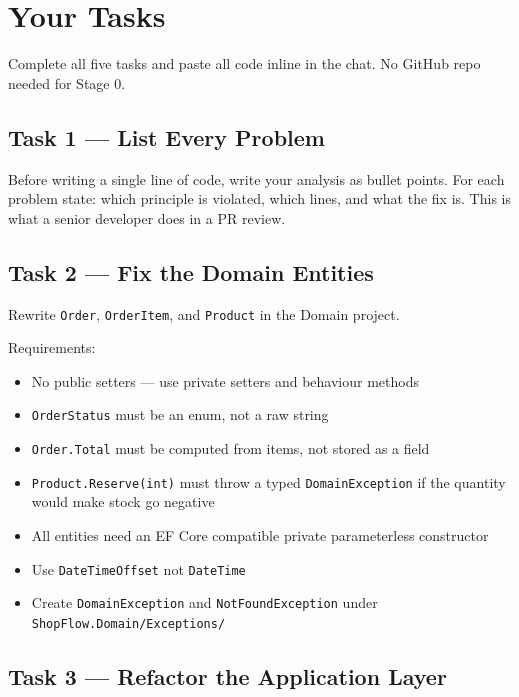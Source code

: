 \documentclass[11pt,a4paper]{article}
\begin{document}
\newpage
\section{Your Tasks}

\begin{taskbox}
Complete all five tasks and paste all code inline in the chat.
No GitHub repo needed for Stage 0.
\end{taskbox}

\subsection{Task 1 --- List Every Problem}

Before writing a single line of code, write your analysis as bullet points.
For each problem state: which principle is violated, which lines, and what the fix is.
This is what a senior developer does in a PR review.

\subsection{Task 2 --- Fix the Domain Entities}

Rewrite \texttt{Order}, \texttt{OrderItem}, and \texttt{Product} in the Domain project.

Requirements:
\begin{itemize}[leftmargin=1.5em,itemsep=3pt]
  \item No public setters --- use private setters and behaviour methods
  \item \texttt{OrderStatus} must be an enum, not a raw string
  \item \texttt{Order.Total} must be computed from items, not stored as a field
  \item \texttt{Product.Reserve(int)} must throw a typed \texttt{DomainException}
        if the quantity would make stock go negative
  \item All entities need an EF Core compatible private parameterless constructor
  \item Use \texttt{DateTimeOffset} not \texttt{DateTime}
  \item Create \texttt{DomainException} and \texttt{NotFoundException}
        under \texttt{ShopFlow.Domain/Exceptions/}
\end{itemize}

\subsection{Task 3 --- Refactor the Application Layer}
\end{document}
